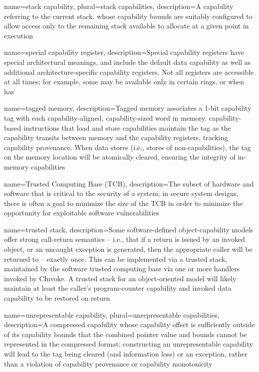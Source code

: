 {
  name=stack capability,
  plural=stack capabilities,
  description={A \gls{capability} referring to the current stack, whose
    \gls{capability bounds} are suitably configured to allow access only to
    the remaining stack available to allocate at a given point in execution}
}

{
  name=special capability register,
  description={Special capability registers have special architectural
    meanings, and include the \gls{default data capability} as well
    as additional architecture-specific capability registers.
    Not all registers are accessible at all times; for example, some may be
    available only in certain rings, or when \PCC{} has
    \cappermASR{}}
}

{
  name=tagged memory,
  description={Tagged memory associates a 1-bit \gls{capability tag} with
    each \gls{capability}-aligned, capability-sized word in memory.
    \Gls{capability-based instructions} that load and store capabilities
    maintain the tag as the capability transits between memory and the
    \glspl{capability register}, tracking \gls{capability provenance}.
    When data stores (i.e., stores of non-capabilities), the tag on the
    memory location will be atomically cleared, ensuring the integrity of
    in-memory capabilities}
}

{
  name=Trusted Computing Base (TCB),
  description={The subset of hardware and software that is critical to the
    security of a system;
    in secure system designs, there is often a goal to minimize the size of
    the TCB in order to minimize the opportunity for exploitable software
    vulnerabilities}
}

{
  name=trusted stack,
  description={Some software-defined object-capability models offer strong
    call-return semantics -- i.e., that if a return is issued by an invoked
    object, or an uncaught exception is generated, then the appropriate caller
    will be returned to -- exactly once.
    This can be implemented via a trusted stack, maintained by the software
    \gls{trusted computing base} via one or more handlers invoked by \gls{CInvoke}.
    A trusted stack for an object-oriented model will likely maintain at least
    the caller's \gls{program-counter capability} and \gls{invoked data
    capability} to be restored on return}
}

{
  name=unrepresentable capability,
  plural=unrepresentable capabilities,
  description={A \gls{compressed capability} whose \gls{capability offset} is
    sufficiently outside of its \gls{capability bounds} that the combined
    \gls{pointer} value and bounds cannot be represented in the compressed format;
    constructing an unrepresentable capability will lead to the tag being
    cleared (and information loss) or an exception, rather than a violation
    of \gls{capability provenance} or \gls{capability monotonicity}}
}


